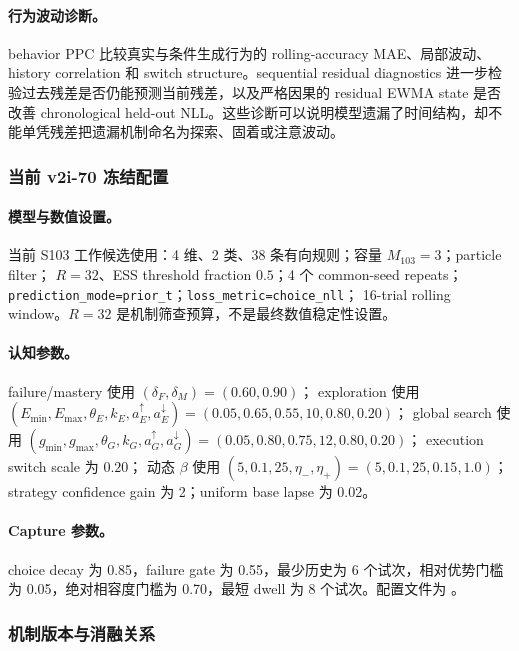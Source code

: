 \paragraph{行为波动诊断。}
behavior PPC 比较真实与条件生成行为的 rolling-accuracy MAE、局部波动、history correlation 和 switch structure。sequential residual diagnostics 进一步检验过去残差是否仍能预测当前残差，以及严格因果的 residual EWMA state 是否改善 chronological held-out NLL。这些诊断可以说明模型遗漏了时间结构，却不能单凭残差把遗漏机制命名为探索、固着或注意波动。


\subsubsection{当前 v2i-70 冻结配置}

\paragraph{模型与数值设置。}
当前 S103 工作候选使用：4 维、2 类、38 条有向规则；容量 $M_{103}=3$；particle filter；
$R=32$、ESS threshold fraction $0.5$；4 个 common-seed repeats；
\texttt{prediction\_mode=prior\_t}；\texttt{loss\_metric=choice\_nll}；
16-trial rolling window。$R=32$ 是机制筛查预算，不是最终数值稳定性设置。

\paragraph{认知参数。}
failure/mastery 使用 $(\delta_F,\delta_M)=(0.60,0.90)$；
exploration 使用
$(E_{\min},E_{\max},\theta_E,k_E,a_E^\uparrow,a_E^\downarrow)
=(0.05,0.65,0.55,10,0.80,0.20)$；
global search 使用
$(g_{\min},g_{\max},\theta_G,k_G,a_G^\uparrow,a_G^\downarrow)
=(0.05,0.80,0.75,12,0.80,0.20)$；
execution switch scale 为 $0.20$；
动态 $\beta$ 使用
$(5,0.1,25,\eta_-,\eta_+)=(5,0.1,25,0.15,1.0)$；
strategy confidence gain 为 2；uniform base lapse 为 0.02。

\paragraph{Capture 参数。}
choice decay 为 0.85，failure gate 为 0.55，最少历史为 6 个试次，相对优势门槛为 0.05，绝对相容度门槛为 0.70，最短 dwell 为 8 个试次。配置文件为
。


\subsubsection{机制版本与消融关系}

